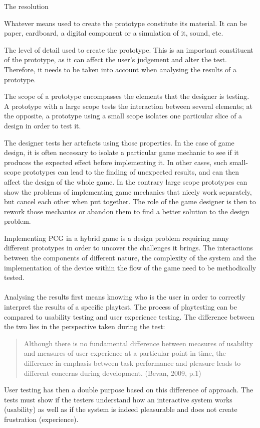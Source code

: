 \begin{labeling}{The resolution}
\item [\textbf{The material}] Whatever means used to create the prototype constitute its material. It can be paper, cardboard, a digital component or a simulation of it, sound, etc.
\item [\textbf{The resolution}] The level of detail used to create the prototype. This is an important constituent of the prototype, as it can affect the user's judgement and alter the test. Therefore, it needs to be taken into account when analysing the results of a prototype.
\item [\textbf{The scope}] The scope of a prototype encompasses the elements that the designer is testing. A prototype with a large scope tests the interaction between several elements; at the opposite, a prototype using a small scope isolates one particular slice of a design in order to test it.
\end{labeling}

The designer tests her artefacts using those properties. In the case of game design, it is often necessary to isolate a particular game mechanic to see if it produces the expected effect before implementing it. In other cases, such small-scope prototypes can lead to the finding of unexpected results, and can then affect the design of the whole game. In the contrary large scope prototypes can show the problems of implementing game mechanics that nicely work separately, but cancel each other when put together. The role of the game designer is then to rework those mechanics or abandon them to find a better solution to the design problem. 

Implementing PCG in a hybrid game is a design problem requiring many different prototypes in order to uncover the challenges it brings. The interactions between the components of different nature, the complexity of the system and the implementation of the device within the flow of the game need to be methodically tested.
\\\\
Analysing the results first means knowing who is the user in order to correctly interpret the results of a specific playtest. The process of playtesting can be compared to usability testing and user experience testing. The difference between the two lies in the perspective taken during the test:
\begin{quotation}
Although there is no fundamental difference between measures of usability and measures of user experience at a particular point in time, the difference in emphasis between task performance and pleasure leads to different concerns during development. (Bevan, 2009, p.1) \cite{pdf:use}
\end{quotation}
User testing has then a double purpose based on this difference of approach. The tests must show if the testers understand how an interactive system works (usability) as well as if the system is indeed pleasurable and does not create frustration (experience).

